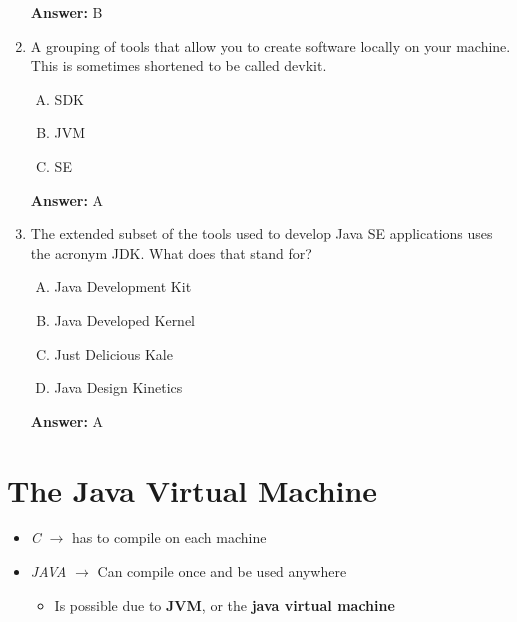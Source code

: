 \documentclass[12pt]{article}
\begin{document}
\begin{enumerate}[1.]
    \bigskip

    \textbf{Answer:} B

    \item

    A grouping of tools that allow you to create software locally on your machine.
    This is sometimes shortened to be called devkit.

    \bigskip

    \begin{enumerate}[A.]
        \item SDK
        \item JVM
        \item SE
    \end{enumerate}

    \bigskip

    \textbf{Answer:} A

    \item

    The extended subset of the tools used to develop Java SE applications uses
    the acronym JDK. What does that stand for?

    \bigskip

    \begin{enumerate}[A.]
        \item Java Development Kit
        \item Java Developed Kernel
        \item Just Delicious Kale
        \item Java Design Kinetics
    \end{enumerate}

    \bigskip

    \textbf{Answer:} A

\end{enumerate}

\bigskip

\section{The Java Virtual Machine}

\bigskip

\begin{itemize}
    \item \textit{C} $\to$ has to compile on each machine
    \item \textit{JAVA} $\to$ Can compile once and be used anywhere
    \begin{itemize}
        \item Is possible due to \textbf{JVM}, or the \textbf{java virtual machine}
    \end{itemize}
\end{itemize}
\end{document}
